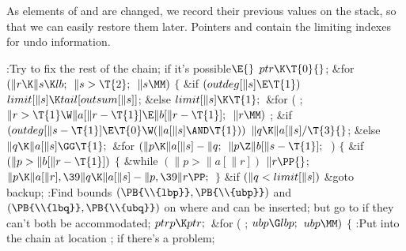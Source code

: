 As elements of  and  are changed, we record their previous
values on the  stack, so that we can easily restore them
later. Pointers  and  contain the limiting indexes
for undo information.

\Y\B\4:Try to fix the rest of the chain;  if it's
possible\X${}\E{}$\6
$\\{ptr}\K\T{0}{}$;\6
\&{for} ${}(\|r\K\|s\K\\{lb};{}$ ${}\|s>\T{2};{}$ ${}\|s\MM){}$\5
${}\{{}$\1\6
\&{if} ${}(\\{outdeg}[\|s]\E\T{1}){}$\1\5
${}\\{limit}[\|s]\K\\{tail}[\\{outsum}[\|s]]{}$;\5
\2\&{else}\1\5
${}\\{limit}[\|s]\K\T{1};{}$\2\6
\&{for} ( ; ${}\|r>\T{1}\W\|a[\|r-\T{1}]\E\|b[\|r-\T{1}];{}$ ${}\|r\MM){}$\1\5
;\2\6
\&{if} ${}(\\{outdeg}[\|s-\T{1}]\E\T{0}\W(\|a[\|s]\AND\T{1})){}$\1\5
${}\|q\K\|a[\|s]/\T{3}{}$;\5
\2\&{else}\1\5
${}\|q\K\|a[\|s]\GG\T{1};{}$\2\6
\&{for} ${}(\|p\K\|a[\|s]-\|q;{}$ ${}\|p\Z\|b[\|s-\T{1}];{}$ \,)\5
${}\{{}$\1\6
\&{if} ${}(\|p>\|b[\|r-\T{1}]){}$\5
${}\{{}$\1\6
\&{while} ${}(\|p>\|a[\|r]){}$\1\5
${}\|r\PP{}$;\2\6
${}\|p\K\|a[\|r],\39\|q\K\|a[\|s]-\|p,\39\|r\PP;{}$\6
\4${}\}{}$\2\6
\&{if} ${}(\|q<\\{limit}[\|s]){}$\1\5
\&{goto} \\{backup};\2\6
:Find bounds $(\PB{\\{lbp}},\PB{\\{ubp}})$ and $(\PB{\\{lbq}},\PB{%
\\{ubq}})$ on where  and  can be inserted; but go to  if they can't both be accommodated\X;\6
${}\\{ptrp}\K\\{ptr};{}$\6
\&{for} ( ; ${}\\{ubp}\G\\{lbp};{}$ ${}\\{ubp}\MM){}$\5
${}\{{}$\1\6
:Put  into the chain at location ;  if there's a problem\X;\6
